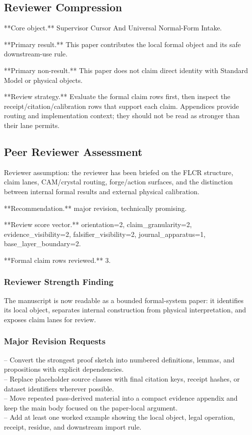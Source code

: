 \documentclass[11pt]{article}
\begin{document}
\subsection*{Reviewer Compression}

**Core object.** Supervisor Cursor And Universal Normal-Form Intake.

**Primary result.** This paper contributes the local formal object and its safe downstream-use rule.

**Primary non-result.** This paper does not claim direct identity with Standard Model or physical objects.

**Review strategy.** Evaluate the formal claim rows first, then inspect the receipt/citation/calibration rows that support each claim. Appendices provide routing and implementation context; they should not be read as stronger than their lane permits.

\subsection*{Peer Reviewer Assessment}

Reviewer assumption: the reviewer has been briefed on the FLCR structure, claim lanes, CAM/crystal routing, forge/action surfaces, and the distinction between internal formal results and external physical calibration.

**Recommendation.** major revision, technically promising.

**Review score vector.** orientation=2, claim\_granularity=2, evidence\_visibility=2, falsifier\_visibility=2, journal\_apparatus=1, base\_layer\_boundary=2.

**Formal claim rows reviewed.** 3.

\subsubsection*{Reviewer Strength Finding}

The manuscript is now readable as a bounded formal-system paper: it identifies its local object, separates internal construction from physical interpretation, and exposes claim lanes for review.

\subsubsection*{Major Revision Requests}

\noindent{}-- Convert the strongest proof sketch into numbered definitions, lemmas, and propositions with explicit dependencies.\\
\noindent{}-- Replace placeholder source classes with final citation keys, receipt hashes, or dataset identifiers wherever possible.\\
\noindent{}-- Move repeated pass-derived material into a compact evidence appendix and keep the main body focused on the paper-local argument.\\
\noindent{}-- Add at least one worked example showing the local object, legal operation, receipt, residue, and downstream import rule.\\
\end{document}
